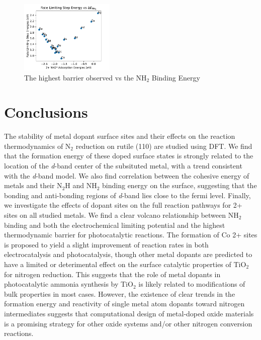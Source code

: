 
\begin{figure}
    \centering
    \includegraphics[width=0.4\textwidth]{Images/NH2_v_rate_limiting.pdf}
    
    \caption{The highest barrier observed vs the NH$_2$ Binding Energy}
    \label{fig:NH2_limiting_bar}
\end{figure}

\section{Conclusions}
The stability of metal dopant surface sites and their effects on the reaction thermodynamics of N$_2$ reduction on rutile (110) are studied using DFT. We find that the formation energy of these doped surface states is strongly related to the location of the \textit{d}-band center of the subsituted metal, with a trend consistent with the \textit{d}-band model. We also find correlation between the cohesive energy of metals and their N$_2$H and NH$_2$ binding energy on the surface, suggesting that the bonding and anti-bonding regions of \textit{d}-band lies close to the fermi level. Finally, we investigate the effects of dopant sites on the full reaction pathways for 2+ sites on all studied metals. We find a clear volcano relationship between NH$_2$ binding and both the electrochemical limiting potential and the highest thermodynamic barrier for photocatalytic reactions. The formation of Co 2+ sites is proposed to yield a slight improvement of reaction rates in both electrocatalysis and photocatalysis, though other metal dopants are predicted to have a limited or deterimental effect on the surface catalytic properties of TiO$_2$ for nitrogen reduction. This suggests that the role of metal dopants in photocatalytic ammonia synthesis by TiO$_2$ is likely related to modifications of bulk properties in most cases. However, the existence of clear trends in the formation energy and reactivity of single metal atom dopants toward nitrogen intermediates suggests that computational design of metal-doped oxide materials is a promising strategy for other oxide systems and/or other nitrogen conversion reactions.

